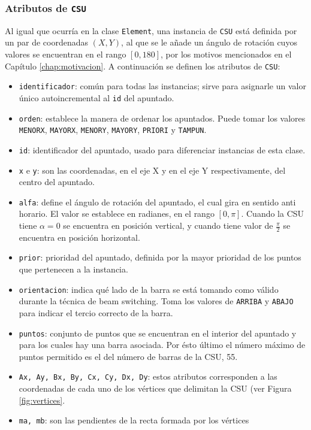 \subsubsection{Atributos de \texttt{CSU}}
Al igual que ocurría en la clase \texttt{Element}, una instancia de \texttt{CSU}
está definida por un par de coordenadas $(X, Y)$, al que se le añade un ángulo de
rotación cuyos valores se encuentran en el rango $[0, 180]$, por los motivos
mencionados en el Capítulo \ref{chap:motivacion}. A continuación se definen los
atributos de \texttt{CSU}:
\begin{itemize}
\item \texttt{identificador}: común para todas las instancias; sirve para
asignarle un valor único autoincremental al \texttt{id} del apuntado.
\item \texttt{orden}: establece la manera de ordenar los apuntados. Puede tomar
los valores \texttt{MENORX}, \texttt{MAYORX}, \texttt{MENORY}, \texttt{MAYORY},
\texttt{PRIORI} y \texttt{TAMPUN}.
\item \texttt{id}: identificador del apuntado, usado para diferenciar instancias
de esta clase.
\item \texttt{x} e \texttt{y}: son las coordenadas, en el eje X y en el eje Y
respectivamente, del centro del apuntado. 
\item \texttt{alfa}: define el ángulo de rotación del apuntado, el cual gira en
sentido anti horario. El valor se establece en radianes, en el rango $[0, \pi]$.
Cuando la CSU tiene $\alpha=0$ se encuentra en posición vertical, y cuando tiene
valor de $\frac{\pi}{2}$ se encuentra en posición horizontal.
\item \texttt{prior}: prioridad del apuntado, definida por la mayor prioridad de
los puntos que pertenecen a la instancia.
\item \texttt{orientacion}: indica qué lado de la barra se está tomando como
válido durante la técnica de beam switching. Toma los valores de \texttt{ARRIBA}
y \texttt{ABAJO} para indicar el tercio correcto de la barra.
\item \texttt{puntos}: conjunto de puntos que se encuentran en el interior del
apuntado y para los cuales hay una barra asociada. Por ésto último el número
máximo de puntos permitido es el del número de barras de la CSU, 55.
\item \texttt{Ax, Ay, Bx, By, Cx, Cy, Dx, Dy}: estos atributos corresponden a
las coordenadas de cada uno de los vértices que delimitan la CSU (ver Figura
\ref{fig:vertices}.  
\item \texttt{ma, mb}: son las pendientes de la recta formada por los vértices

\end{itemize}
